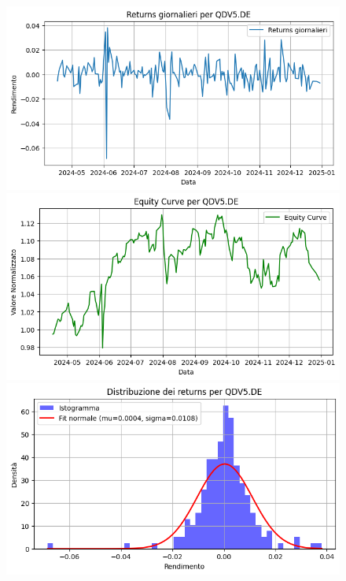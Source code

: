 \documentclass{article}%
\begin{document}
\begin{figure}[htbp]%
\begin{minipage}{0.31\textwidth}%
\includegraphics[width=\linewidth]{immagini_tickers/QDV5.DE_returns_plot.png}%
\end{minipage}%
\begin{minipage}{0.31\textwidth}%
\includegraphics[width=\linewidth]{immagini_tickers/QDV5.DE_equity_curve.png}%
\end{minipage}%
\begin{minipage}{0.31\textwidth}%
\includegraphics[width=\linewidth]{immagini_tickers/QDV5.DE_distribuzione_returns.png}%
\end{minipage}%
\end{figure}
\end{document}
